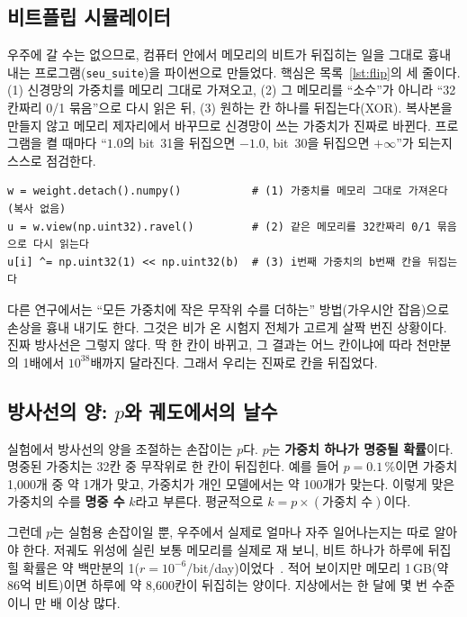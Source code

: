 \documentclass[11pt,a4paper]{article}
\newcommand{\code}[1]{\texttt{#1}}
\newcounter{easy}
\begin{document}
\subsection{비트플립 시뮬레이터}
우주에 갈 수는 없으므로, 컴퓨터 안에서 메모리의 비트가 뒤집히는 일을 그대로 흉내 내는 프로그램(\code{seu\_suite})을 파이썬으로 만들었다. 핵심은 목록~\ref{lst:flip}의 세 줄이다. (1) 신경망의 가중치를 메모리 그대로 가져오고, (2) 그 메모리를 ``소수''가 아니라 ``32칸짜리 0/1 묶음''으로 다시 읽은 뒤, (3) 원하는 칸 하나를 뒤집는다(XOR). 복사본을 만들지 않고 메모리 제자리에서 바꾸므로 신경망이 쓰는 가중치가 진짜로 바뀐다. 프로그램을 켤 때마다 ``$1.0$의 bit~31을 뒤집으면 $-1.0$, bit~30을 뒤집으면 $+\infty$''가 되는지 스스로 점검한다.

\begin{lstlisting}[float=htb,caption={비트플립의 핵심 세 줄(\code{src/radiation.py}의 \code{xor\_one\_bit}을 줄인 것).},label={lst:flip}]
w = weight.detach().numpy()           # (1) 가중치를 메모리 그대로 가져온다 (복사 없음)
u = w.view(np.uint32).ravel()         # (2) 같은 메모리를 32칸짜리 0/1 묶음으로 다시 읽는다
u[i] ^= np.uint32(1) << np.uint32(b)  # (3) i번째 가중치의 b번째 칸을 뒤집는다
\end{lstlisting}

\begin{easy}
다른 연구에서는 ``모든 가중치에 작은 무작위 수를 더하는'' 방법(가우시안 잡음)으로 손상을 흉내 내기도 한다. 그것은 비가 온 시험지 전체가 고르게 살짝 번진 상황이다. 진짜 방사선은 그렇지 않다. 딱 한 칸이 바뀌고, 그 결과는 어느 칸이냐에 따라 천만분의 1배에서 $10^{38}$배까지 달라진다. 그래서 우리는 진짜로 칸을 뒤집었다.
\end{easy}

\subsection{방사선의 양: $p$와 궤도에서의 날수}
실험에서 방사선의 양을 조절하는 손잡이는 $p$다. $p$는 \textbf{가중치 하나가 명중될 확률}이다. 명중된 가중치는 32칸 중 무작위로 한 칸이 뒤집힌다. 예를 들어 $p=0.1\,\%$이면 가중치 1,000개 중 약 1개가 맞고, 가중치가 \NumWeights{}개인 모델에서는 약 100개가 맞는다. 이렇게 맞은 가중치의 수를 \textbf{명중 수} $k$라고 부른다. 평균적으로 $k=p\times(\text{가중치 수})$이다.

그런데 $p$는 실험용 손잡이일 뿐, 우주에서 실제로 얼마나 자주 일어나는지는 따로 알아야 한다. 저궤도 위성에 실린 보통 메모리를 실제로 재 보니, 비트 하나가 하루에 뒤집힐 확률은 약 백만분의 1($r=10^{-6}$/bit/day)이었다~\citep{bentoutou2008}. 적어 보이지만 메모리 1\,GB(약 86억 비트)이면 하루에 약 8,600칸이 뒤집히는 양이다. 지상에서는 한 달에 몇 번 수준이니 만 배 이상 많다.
\end{document}
